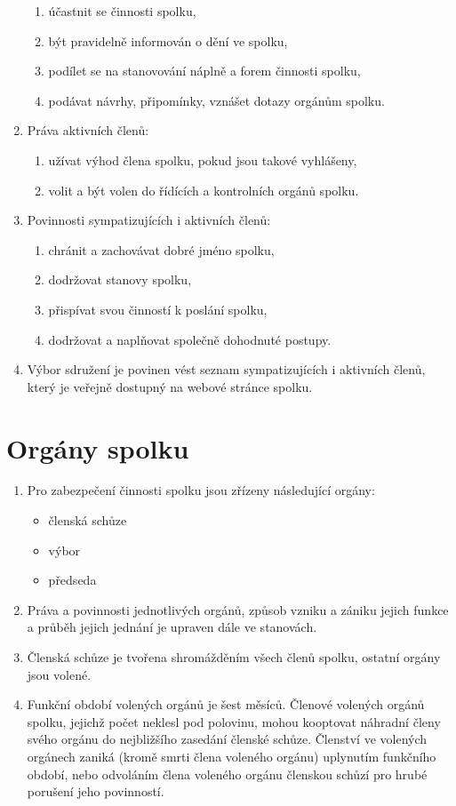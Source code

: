 \documentclass[11pt]{article}
\begin{document}
\begin{enumerate}
\begin{enumerate}
\item účastnit se činnosti spolku,
\item být pravidelně informován o dění ve spolku,
\item podílet se na stanovování náplně a forem činnosti spolku,
\item podávat návrhy, připomínky, vznášet dotazy orgánům spolku.
\end{enumerate}
\item Práva aktivních členů:
\begin{enumerate}
\item užívat výhod člena spolku, pokud jsou takové vyhlášeny,
\item volit a být volen do řídících a kontrolních orgánů spolku.
\end{enumerate}
\item Povinnosti sympatizujících i aktivních členů:
\begin{enumerate}
\item chránit a zachovávat dobré jméno spolku,
\item dodržovat stanovy spolku,
\item přispívat svou činností k poslání spolku,
\item dodržovat a naplňovat společně dohodnuté postupy.
\end{enumerate}
\item Výbor sdružení je povinen vést seznam sympatizujících i aktivních členů, který je veřejně dostupný na webové stránce spolku. 
\end{enumerate}

\section{Orgány spolku}
\begin{enumerate}
\item  Pro zabezpečení činnosti spolku jsou zřízeny následující orgány: 
\begin{itemize}
\item členská schůze
\item výbor 
\item předseda
\end{itemize}
\item Práva a povinnosti jednotlivých orgánů, způsob vzniku a zániku jejich funkce a průběh jejich jednání je upraven dále ve stanovách.
\item Členská schůze je tvořena shromážděním všech členů spolku, ostatní orgány jsou volené.
\item Funkční období volených orgánů je šest měsíců. Členové volených orgánů spolku, jejichž počet neklesl pod polovinu, mohou kooptovat náhradní členy svého orgánu do nejbližšího zasedání členské schůze. Členství ve volených orgánech zaniká (kromě smrti člena voleného orgánu) uplynutím funkčního období, nebo odvoláním člena voleného orgánu členskou schůzí pro hrubé porušení jeho povinností. 
\end{enumerate}
\end{document}
